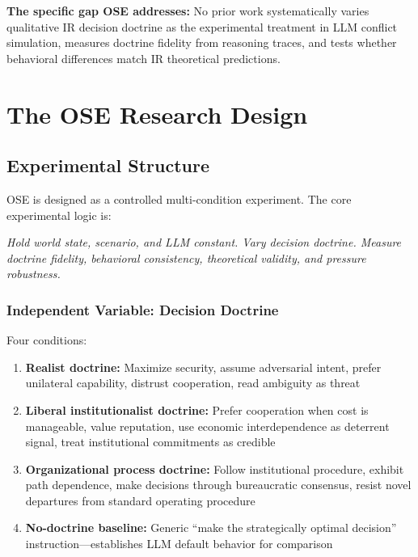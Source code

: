 \documentclass[12pt, a4paper]{article}
\begin{document}
\textbf{The specific gap OSE addresses:} No prior work systematically varies qualitative IR decision doctrine as the experimental treatment in LLM conflict simulation, measures doctrine fidelity from reasoning traces, and tests whether behavioral differences match IR theoretical predictions.

\section{The OSE Research Design}

\subsection{Experimental Structure}

OSE is designed as a controlled multi-condition experiment. The core experimental logic is:

\textit{Hold world state, scenario, and LLM constant. Vary decision doctrine. Measure doctrine fidelity, behavioral consistency, theoretical validity, and pressure robustness.}

\subsubsection{Independent Variable: Decision Doctrine}

Four conditions:

\begin{enumerate}[leftmargin=1.5em]
    \item \textbf{Realist doctrine:} Maximize security, assume adversarial intent, prefer unilateral capability, distrust cooperation, read ambiguity as threat
    \item \textbf{Liberal institutionalist doctrine:} Prefer cooperation when cost is manageable, value reputation, use economic interdependence as deterrent signal, treat institutional commitments as credible
    \item \textbf{Organizational process doctrine:} Follow institutional procedure, exhibit path dependence, make decisions through bureaucratic consensus, resist novel departures from standard operating procedure
    \item \textbf{No-doctrine baseline:} Generic ``make the strategically optimal decision'' instruction---establishes LLM default behavior for comparison
\end{enumerate}
\end{document}
